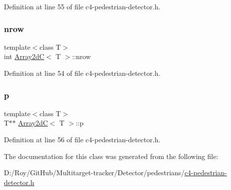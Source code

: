 Definition at line 55 of file c4-\/pedestrian-\/detector.\+h.

\mbox{\label{class_array2d_c_a12f690f7195f7674a86a7e1eedbc473c}} 
\subsubsection{\texorpdfstring{nrow}{nrow}}
{\footnotesize\ttfamily template$<$class T$>$ \\
int \mbox{\hyperlink{class_array2d_c}{Array2dC}}$<$ T $>$\+::nrow}



Definition at line 54 of file c4-\/pedestrian-\/detector.\+h.

\mbox{\label{class_array2d_c_a727eae5d663d463635cc150e6f771f0d}} 
\subsubsection{\texorpdfstring{p}{p}}
{\footnotesize\ttfamily template$<$class T$>$ \\
T$\ast$$\ast$ \mbox{\hyperlink{class_array2d_c}{Array2dC}}$<$ T $>$\+::p}



Definition at line 56 of file c4-\/pedestrian-\/detector.\+h.



The documentation for this class was generated from the following file\+:\begin{DoxyCompactItemize}
\item 
D\+:/\+Roy/\+Git\+Hub/\+Multitarget-\/tracker/\+Detector/pedestrians/\mbox{\hyperlink{c4-pedestrian-detector_8h}{c4-\/pedestrian-\/detector.\+h}}\end{DoxyCompactItemize}

